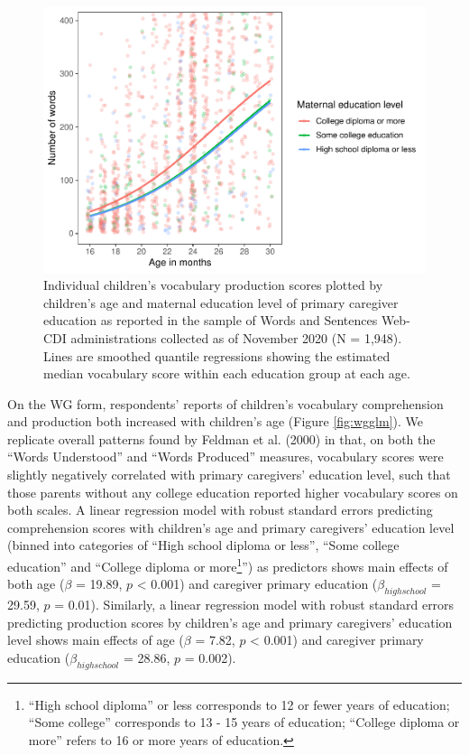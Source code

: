 \documentclass[
  english,
  man]{apa7}
\begin{document}
\begin{figure}
\centering
\includegraphics{webcdi_paper_files/figure-latex/wsglm-1.pdf}
\caption{\label{fig:wsglm}Individual children's vocabulary production scores plotted by children's age and maternal education level of primary caregiver education as reported in the sample of Words and Sentences Web-CDI administrations collected as of November 2020 (N = 1,948). Lines are smoothed quantile regressions showing the estimated median vocabulary score within each education group at each age.}
\end{figure}

On the WG form, respondents' reports of children's vocabulary comprehension and production both increased with children's age (Figure \ref{fig:wgglm}). We replicate overall patterns found by Feldman et al. (2000) in that, on both the \enquote{Words Understood} and \enquote{Words Produced} measures, vocabulary scores were slightly negatively correlated with primary caregivers' education level, such that those parents without any college education reported higher vocabulary scores on both scales. A linear regression model with robust standard errors predicting comprehension scores with children's age and primary caregivers' education level (binned into categories of \enquote{High school diploma or less}, \enquote{Some college education} and \enquote{College diploma or more\footnote{``High school diploma'' or less corresponds to 12 or fewer years of education; ``Some college'' corresponds to 13 - 15 years of education; ``College diploma or more'' refers to 16 or more years of education.}}) as predictors shows main effects of both age (\(\beta\) = 19.89, \(p\) \textless{} 0.001) and caregiver primary education (\(\beta_{high school}\) = 29.59, \(p\) = 0.01). Similarly, a linear regression model with robust standard errors predicting production scores by children's age and primary caregivers' education level shows main effects of age (\(\beta\) = 7.82, \(p\) \textless{} 0.001) and caregiver primary education (\(\beta_{high school}\) = 28.86, \(p\) = 0.002).
\end{document}
